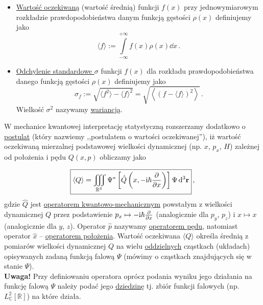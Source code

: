 \documentclass{myclass}
\begin{document}
\begin{itemize}

    \item \underline{Wartość oczekiwaną} (wartość średnią) funkcji \(f(x)\) przy jednowymiarowym
    rozkładzie prawdopodobieństwa danym funkcją gęstości \(\rho(x)\) definiujemy jako
    \begin{equation*}
        \langle f\rangle := \int\limits_{-\infty}^{+\infty}f(x)\rho(x)\dd{x}\,.
    \end{equation*}

    \item \underline{Odchylenie standardowe \(\sigma\)} funkcji \(f(x)\) dla rozkładu
    prawdopodobieństwa danego funkcją gęstości \(\rho(x)\) definiujemy jako
    \begin{equation*}
        \sigma_f:=\sqrt{\langle f^2\rangle-\langle f\rangle^2}=\sqrt{\left\langle(f-\langle f\rangle)^2\right\rangle}\,.
    \end{equation*}
    Wielkość \(\sigma^2\) nazywamy \underline{wariancją}.
    \end{itemize}
\label{postulat1}W mechanice kwantowej interpretację statystyczną rozszerzamy dodatkowo o
\underline{postulat} (który nazwiemy ,,postulatem o wartości oczekiwanej''), iż wartość oczekiwaną
mierzalnej podstawowej wielkości dynamicznej (np. \(x\), \(p_x\), \(H\)) zależnej od położenia i
pędu \(Q(x,p)\) obliczamy jako

\begin{equation*}
            \boxed{\langle Q \rangle=\iiint_{\mathbb{R}^3}\Psi^*\left[\hat{Q}\left(x,-\mathrm{i}\hbar\pdv{ }{x}\right)\right]\Psi \dd{^3\mathbf{r}} }\,,
\end{equation*}
gdzie \(\hat{Q}\) jest \underline{operatorem kwantowo-mechanicznym} powstałym z wielkości
dynamicznej \(Q\) przez podstawienie \(p_x\mapsto-\mathrm{i}\hbar\pdv{ }{x}\) (analogicznie dla \(p_y\),
\(p_z\)) i \(x\mapsto x\) (analogicznie dla \(y\), \(z\)). Operator \(\hat{p}\) nazywamy
\underline{operatorem pędu}, natomiast operator \(\hat{x}\) -- \underline{operatorem położenia}.
Wartość oczekiwana \(\langle Q\rangle\) określa średnią z pomiarów wielkości dynamicznej \(Q\) na
wielu \underline{oddzielnych} cząstkach (układach) opisywanych zadaną funkcją falową \(\Psi\)
(mówimy o cząstkach znajdujących się w stanie \(\Psi\)).\\

\textbf{Uwaga!} Przy definiowaniu operatora oprócz podania wyniku jego działania na funkcję falową
\(\Psi\) należy podać jego \underline{dziedzinę} tj. zbiór funkcji falowych (np.
\(L^2_\mathbb{C}[\mathbb{R}]\)) na które działa.
\medskip
\end{document}
